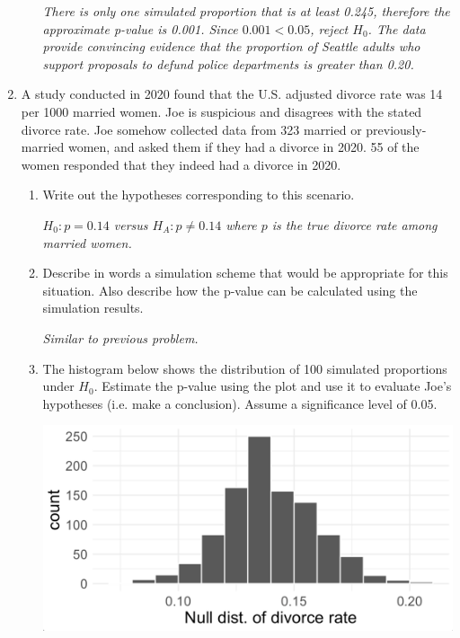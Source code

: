 \documentclass[12pt]{article}   	%
\newcommand{\soln}[2]{\textit{\textcolor{custom_red}{#2}}}{}
\begin{document}
\begin{enumerate}
\begin{enumerate}
    \soln{}{There is only one simulated proportion that is at least 0.245, therefore the approximate p-value is 0.001. Since $0.001 < 0.05$, reject $H_{0}$. The data provide convincing evidence that the proportion of Seattle adults who support proposals to
defund police departments is greater than 0.20.}
    
  \end{enumerate}
  
  \item
  A study conducted in 2020 found that the U.S. adjusted divorce rate
  was 14 per 1000 married women. Joe is suspicious and disagrees with
  the stated divorce rate. Joe somehow collected data from 323 married
  or previously-married women, and asked them if they had a divorce in
  2020. 55 of the women responded that they indeed had a divorce in
  2020.

  \begin{enumerate}
  \item
    Write out the hypotheses corresponding to this scenario.
    
    \soln{}{$H_{0}: p = 0.14$ versus $H_{A}: p \neq 0.14$ where $p$ is the true divorce rate among married women.}
    
      \item
    Describe in words a simulation scheme that would be appropriate for
    this situation. Also describe how the p-value can be calculated
    using the simulation results.
    
    \soln{}{Similar to previous problem.}
    
  \item
    The histogram below shows the distribution of 100 simulated
    proportions under \(H_{0}\). Estimate the p-value using the plot and
    use it to evaluate Joe's hypotheses (i.e. make a conclusion). Assume
    a significance level of 0.05.

    \includegraphics[scale = 0.5]{images/13-divorce.png}
    

\end{enumerate}
\end{enumerate}
\end{document}
